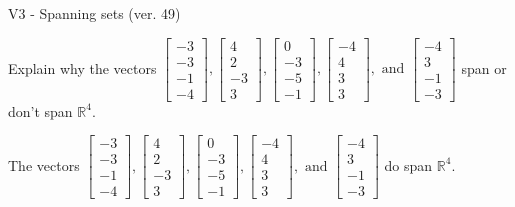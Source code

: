 \begin{exercise}
  \begin{exerciseTitle}V3 - Spanning sets (ver. 49)\end{exerciseTitle}
  \begin{exerciseStatement}
    Explain why the vectors \(\left[\begin{array}{r}
-3 \\
-3 \\
-1 \\
-4
\end{array}\right] , \left[\begin{array}{r}
4 \\
2 \\
-3 \\
3
\end{array}\right] , \left[\begin{array}{r}
0 \\
-3 \\
-5 \\
-1
\end{array}\right] , \left[\begin{array}{r}
-4 \\
4 \\
3 \\
3
\end{array}\right] , \text{ and } \left[\begin{array}{r}
-4 \\
3 \\
-1 \\
-3
\end{array}\right]\) span or don't span \(\mathbb{R}^4\). 
	


  \end{exerciseStatement}
  \begin{exerciseAnswer}
   The vectors \(\left[\begin{array}{r}
-3 \\
-3 \\
-1 \\
-4
\end{array}\right] , \left[\begin{array}{r}
4 \\
2 \\
-3 \\
3
\end{array}\right] , \left[\begin{array}{r}
0 \\
-3 \\
-5 \\
-1
\end{array}\right] , \left[\begin{array}{r}
-4 \\
4 \\
3 \\
3
\end{array}\right] , \text{ and } \left[\begin{array}{r}
-4 \\
3 \\
-1 \\
-3
\end{array}\right]\) 
  	 do  
	span \(\mathbb{R}^4\).
  



\end{exerciseAnswer}
\end{exercise}
